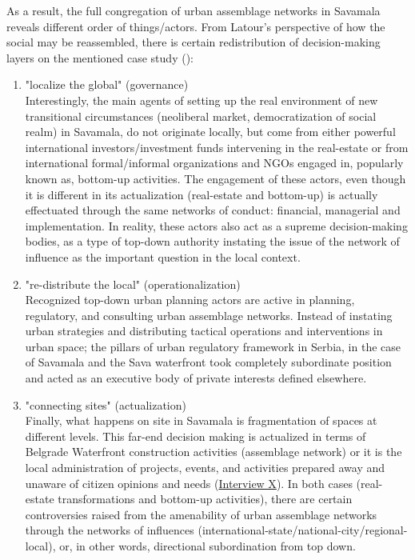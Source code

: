 \documentclass[11pt]{report}
\begin{document}
As a result, the full congregation of urban assemblage networks in Savamala reveals different order of things/actors. From Latour's perspective of how the social may be reassembled, there is certain redistribution of decision-making layers on the mentioned case study (\href{ref}{\citealt{latour_reassembling_2005}}):

\begin{enumerate}
\item "localize the global" (governance)
\\
Interestingly, the main agents of setting up the real environment of new transitional circumstances (neoliberal market, democratization of social realm) in Savamala, do not originate locally, but come from either powerful international investors/investment funds intervening in the real-estate or from international formal/informal organizations and NGOs engaged in, popularly known as, bottom-up activities.
The engagement of these actors, even though it is different in its actualization (real-estate and bottom-up) is actually effectuated through the same networks of conduct: financial, managerial and implementation.
In reality, these actors also act as a supreme decision-making bodies, as a type of top-down authority instating the issue of the network of influence as the important question in  the local context. 

\item "re-distribute the local" (operationalization)
\\
Recognized top-down urban planning actors are active in planning, regulatory, and consulting urban assemblage networks.
Instead of instating urban strategies and distributing tactical operations and interventions in urban space; the pillars of urban regulatory framework in Serbia, in the case of Savamala and the Sava waterfront took completely subordinate position and acted as an executive body of private interests defined elsewhere.

\item "connecting sites" (actualization)
\\
Finally, what happens on site in Savamala is fragmentation of spaces at different levels.
This far-end decision making is actualized in terms of Belgrade Waterfront construction activities (assemblage network) or it is the local administration of projects, events, and activities prepared away and unaware of citizen opinions and needs (\href{InterviewX}{Interview X}).
In both cases (real-estate transformations and bottom-up activities), there are certain controversies raised from the amenability of urban assemblage networks through the networks of influences (international-state/national-city/regional-local), or, in other words, directional subordination from top down.
\end{enumerate}
\end{document}
